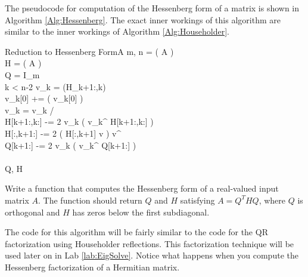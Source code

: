 The pseudocode for computation of the Hessenberg form of a matrix is shown in Algorithm \ref{Alg:Hessenberg}.
The exact inner workings of this algorithm are similar to the inner workings of Algorithm \ref{Alg:Householder}.

\begin{pseudo}{Reduction to Hessenberg Form}{A}
\label{Alg:Hessenberg}
m, n =  \left( A \right) \\
H =  \left( A \right) \\
Q = I_m \\
 \leq k < n-2
\DO
\BEGIN
   v_k = (H_{k+1:,k})\\
   v_k[0] +=  \left( v_k[0] \right)  \\
   v_k = v_k /  \\
   H[k+1:,k:] -= 2 v_k \left( v_k^ H[k+1:,k:] \right) \\
   H[:,k+1:] -= 2 \left( H[:,k+1] v \right) v^ \\
   Q[k+1:] -= 2 v_k \left( v_k^ Q[k+1:] \right) \\
\END \\
 Q, H
\end{pseudo}

\begin{problem}
Write a function  that computes the Hessenberg form of a real-valued
input matrix $A$. The function should return $Q$ and $H$ satisfying $A = Q^THQ$,
where $Q$ is orthogonal and $H$ has zeros below the first subdiagonal.

The code for this algorithm will be fairly similar to the code for the QR factorization using Householder reflections.
This factorization technique will be used later on in Lab \ref{lab:EigSolve}.
Notice what happens when you compute the Hessenberg factorization of a Hermitian matrix.
\end{problem}

